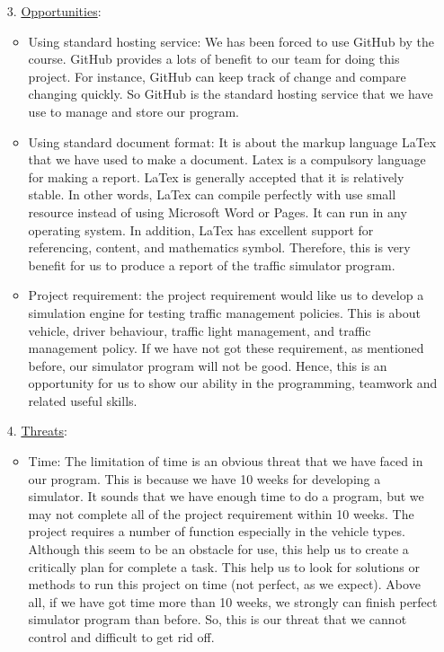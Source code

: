 \documentclass[11pt]{article}
\begin{document}
\begin{itemize}
		\item[3. ] \underline{Opportunities}: 
		\begin{itemize}
			\item{} Using standard hosting service: We has been forced to use GitHub by the course. GitHub provides a lots of benefit to our team for doing this project. For instance, GitHub can keep track of change and compare changing quickly. So GitHub is the standard hosting service that we have use to manage and store our program.
			\item{} Using standard document format: It is about the markup language LaTex that we have used to make a document. Latex is a compulsory language for making a report. LaTex is generally accepted that it is relatively stable. In other words, LaTex can compile perfectly with use small resource instead of using Microsoft Word or Pages. It can run in any operating system. In addition, LaTex has excellent support for referencing, content, and mathematics symbol. Therefore, this is very benefit for us to produce a report of the traffic simulator program.
			\item{} Project requirement: the project requirement would like us to develop a simulation engine for testing traffic management policies. This is about vehicle, driver behaviour, traffic light management, and traffic management policy. If we have not got these requirement, as mentioned before, our simulator program will not be good. Hence, this is an opportunity for us to show our ability in the programming, teamwork and related useful skills. 

  		\end{itemize}				

		\item[4. ] \underline{Threats}:
		\begin{itemize}
			\item{} Time: The limitation of time is an obvious threat that we have faced in our program. This is because  we have 10 weeks for developing a simulator. It sounds that we have enough time to do a program, but we may not complete all of the project requirement within 10 weeks. The project requires a number of function especially in the vehicle types. Although this seem to be an obstacle for use, this help us to create a critically plan for complete a task. This help us to look for solutions or methods to run this project on time (not perfect, as we expect). Above all, if we have got time more than 10 weeks, we strongly can finish perfect simulator program than before.  So, this is our threat that we cannot control and difficult to get rid off.
  		\end{itemize}					
	\end{itemize}
\end{document}

